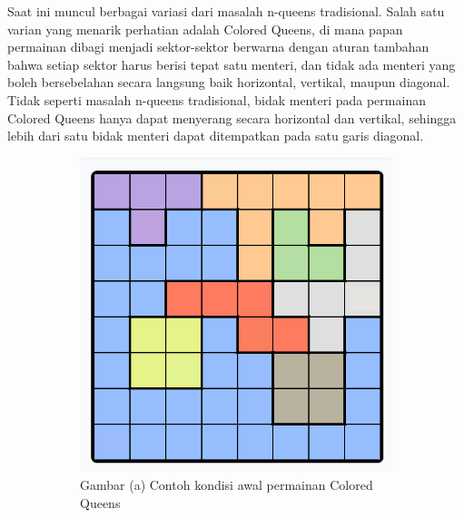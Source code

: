 \documentclass[a4paper,twoside]{article}
\begin{document}
	
	Saat ini muncul berbagai variasi dari masalah n-queens tradisional. Salah satu varian yang menarik perhatian adalah Colored Queens, di mana papan permainan dibagi menjadi sektor-sektor berwarna dengan aturan tambahan bahwa setiap sektor harus berisi tepat satu menteri, dan tidak ada menteri yang boleh bersebelahan secara langsung baik horizontal, vertikal, maupun diagonal. Tidak seperti masalah n-queens tradisional, bidak menteri pada permainan Colored Queens hanya dapat menyerang secara horizontal dan vertikal, sehingga lebih dari satu bidak menteri dapat ditempatkan pada satu garis diagonal.

	\begin{figure}[H]
		\centering
 
		
		\begin{subfigure}{0.35\textwidth}
			\centering
			\includegraphics[width=\linewidth]{images/Queens_unsolved.png}
			\caption*{Gambar \thefigure(a) Contoh kondisi awal permainan Colored Queens}
			\label{fig:Queens_unsolved}
		\end{subfigure}
		\hspace{2cm}
		\begin{subfigure}{0.35\textwidth}
			\centering

\end{subfigure}
\end{figure}
\end{document}
